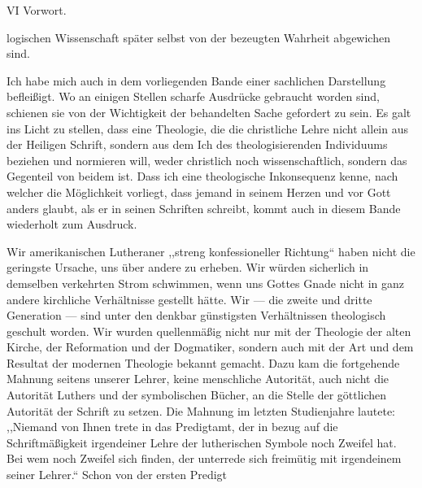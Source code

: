 VI \hfill Vorwort.

logischen Wissenschaft später selbst von der bezeugten Wahrheit abgewichen sind.

Ich habe mich auch in dem vorliegenden Bande einer sachlichen Darstellung befleißigt. Wo an einigen Stellen scharfe Ausdrücke gebraucht worden sind, schienen sie von der Wichtigkeit der behandelten Sache gefordert zu sein. Es galt ins Licht zu stellen, dass eine Theologie, die die christliche Lehre nicht allein aus der Heiligen Schrift, sondern aus dem Ich des theologisierenden Individuums beziehen und normieren will, weder christlich noch wissenschaftlich, sondern das Gegenteil von beidem ist. Dass ich eine theologische Inkonsequenz kenne, nach welcher die Möglichkeit vorliegt, dass jemand in seinem Herzen und vor Gott anders glaubt, als er in seinen Schriften schreibt, kommt auch in diesem Bande wiederholt zum Ausdruck.

Wir amerikanischen Lutheraner ,,streng konfessioneller Richtung`` haben nicht die geringste Ursache, uns über andere zu erheben. Wir würden sicherlich in demselben verkehrten Strom schwimmen, wenn uns Gottes Gnade nicht in ganz andere kirchliche Verhältnisse gestellt hätte. Wir --- die zweite und dritte Generation --- sind unter den denkbar günstigsten Verhältnissen theologisch geschult worden. Wir wurden quellenmäßig nicht nur mit der Theologie der alten Kirche, der Reformation und der Dogmatiker, sondern auch mit der Art und dem Resultat der modernen Theologie bekannt gemacht. Dazu kam die fortgehende Mahnung seitens unserer Lehrer, keine menschliche Autorität, auch nicht die Autorität Luthers und der symbolischen Bücher, an die Stelle der göttlichen Autorität der Schrift zu setzen. Die Mahnung im letzten Studienjahre lautete: ,,Niemand von Ihnen trete in das Predigtamt, der in bezug auf die Schriftmäßigkeit irgendeiner Lehre der lutherischen Symbole noch Zweifel hat. Bei wem noch Zweifel sich finden, der unterrede sich freimütig mit irgendeinem seiner Lehrer.`` Schon von der ersten Predigt